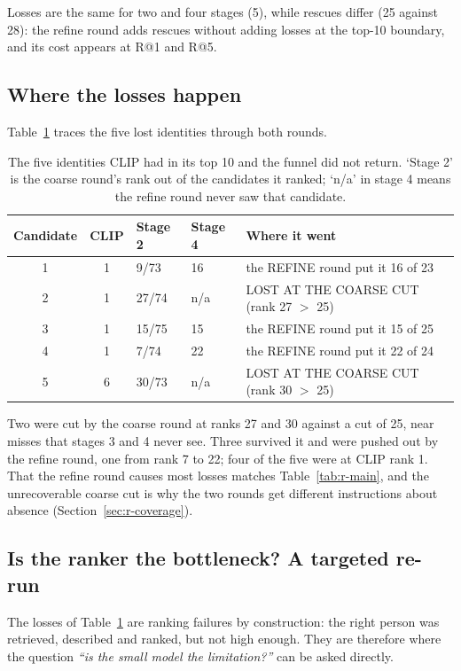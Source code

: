 Losses are the same for two and four stages (5), while rescues differ (25 against
28): the refine round adds rescues without adding losses at the top-10 boundary,
and its cost appears at R@1 and R@5.

\subsection{Where the losses happen}
\label{sec:r-lostwhere}
Table~\ref{tab:r-lostwhy} traces the five lost identities through both rounds.

\begin{table}[H]
\centering
\small
\begin{tabular}{@{}ccllp{4.6cm}@{}}
\toprule
\textbf{Candidate} & \textbf{CLIP} & \textbf{Stage 2} & \textbf{Stage 4} &
\textbf{Where it went}\\
\midrule
1 & 1 & 9/73  & 16 & the REFINE round put it 16 of 23\\
2 & 1 & 27/74 & n/a & LOST AT THE COARSE CUT (rank 27 $>$ 25)\\
3 & 1 & 15/75 & 15 & the REFINE round put it 15 of 25\\
4 & 1 & 7/74  & 22 & the REFINE round put it 22 of 24\\
5 & 6 & 30/73 & n/a & LOST AT THE COARSE CUT (rank 30 $>$ 25)\\
\bottomrule
\end{tabular}
\caption[Where the five lost identities went]{The five identities CLIP had in its top 10 and the funnel did not
return. `Stage 2' is the coarse round's rank out of the candidates it ranked;
`n/a' in stage 4 means the refine round never saw that candidate.}
\label{tab:r-lostwhy}
\end{table}

Two were cut by the coarse round at ranks 27 and 30 against a cut of 25, near misses
that stages 3 and 4 never see. Three survived it and were pushed out by the refine
round, one from rank 7 to 22; four of the five were at CLIP rank 1. That the refine
round causes most losses matches Table~\ref{tab:r-main}, and the unrecoverable
coarse cut is why the two rounds get different instructions about absence
(Section~\ref{sec:r-coverage}).

\subsection{Is the ranker the bottleneck? A targeted re-run}
\label{sec:r-rerun}
The losses of Table~\ref{tab:r-lostwhy} are ranking failures by construction: the
right person was retrieved, described and ranked, but not high enough. They are
therefore where the question \emph{``is the small model the limitation?''} can be
asked directly.

